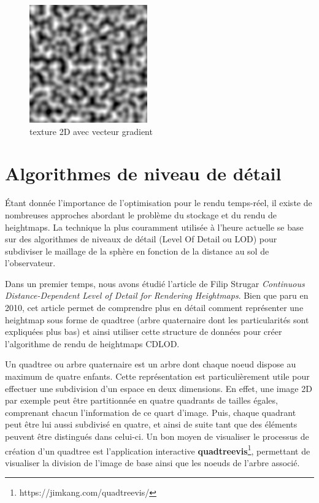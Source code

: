 \documentclass[12pt]{report}
\begin{document}
\begin{enumerate}
    \begin{figure}[h]
        \centering
        \includegraphics[scale = 0.5]{images/gradientcoherentnoise2d.png}
        \caption{texture 2D avec vecteur gradient}
    \end{figure}
    
\end{enumerate}

\newpage

\section{Algorithmes de niveau de détail}

Étant donnée l'importance de l'optimisation pour le rendu temps-réel, il existe de nombreuses approches abordant le problème du stockage et du rendu de heightmaps. La technique la plus couramment utilisée à l'heure actuelle se base sur des algorithmes de niveaux de détail (Level Of Detail ou LOD) pour subdiviser le maillage de la sphère en fonction de la distance au sol de l'observateur.

Dans un premier temps, nous avons étudié l'article de Filip Strugar \textit{Continuous Distance-Dependent Level of Detail for Rendering Heightmaps}\textbf{\cite{FStrugar}}. Bien que paru en 2010, cet article permet de comprendre plus en détail comment représenter une heightmap sous forme de quadtree (arbre quaternaire dont les particularités sont expliquées plus bas) et ainsi utiliser cette structure de données pour créer l'algorithme de rendu de heightmaps CDLOD.

Un quadtree ou arbre quaternaire est un arbre dont chaque noeud dispose au maximum de quatre enfants. Cette représentation est particulièrement utile pour effectuer une subdivision d'un espace en deux dimensions. En effet, une image 2D par exemple peut être partitionnée en quatre quadrants de tailles égales, comprenant chacun l'information de ce quart d'image. Puis, chaque quadrant peut être lui aussi subdivisé en quatre, et ainsi de suite tant que des éléments peuvent être distingués dans celui-ci. Un bon moyen de visualiser le processus de création d'un quadtree est l'application interactive \textbf{quadtreevis}\footnote{https://jimkang.com/quadtreevis/}, permettant de visualiser la division de l'image de base ainsi que les noeuds de l'arbre associé.
\end{document}
